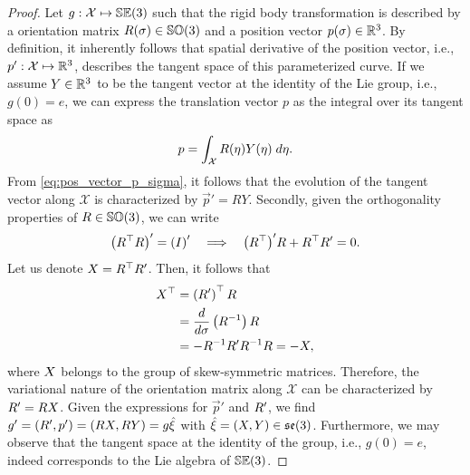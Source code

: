 \begin{proof}
Let ${g}: \mathcal{X} \mapsto {\mathbb{SE}(3)}$ such that the rigid body transformation is described by a orientation matrix $R(\sigma) \in {\mathbb{SO}(3)}$ and a position vector $p(\sigma) \in \mathbb{R}^3$. By definition, it inherently follows that spatial derivative of the position vector, i.e., ${p}': \mathcal{X} \mapsto \mathbb{R}^3$, describes the tangent space of this parameterized curve. If we assume ${Y} \in \mathbb{R}^3$ to be the tangent vector at the identity of the Lie group, i.e., $g(0) = e$, we can express the translation vector $p$ as the integral over its tangent space as
\begin{equation}
{p} = \int_\mathcal{X} {R}(\eta) {Y}(\eta) \; d\eta. \label{eq:pos_vector_p_sigma}
\end{equation}
From \eqref{eq:pos_vector_p_sigma}, it follows that the evolution of the tangent vector along $\mathcal{X}$ is characterized by $\vec{p}' = R Y$. Secondly, given the orthogonality properties of $R \in {\mathbb{SO}(3)}$, we can write
\begin{align}
\left( R^\top R \right)' = \left( {I} \right)' \quad \Longrightarrow \quad \left({R}^\top \right)'\!{R} + {R}^\top {R}' = {0}.
\end{align}
Let us denote ${{X}} = {R}^\top {R}'$. Then, it follows that 
\begin{align}
 {X}^\top & = \left({R}'\right)^\top {R} \notag \\ 
& = \frac{d}{d\sigma}\left({R}^{-1} \right) {R} \notag \\ 
& = -{R}^{-1} {R}' {R}^{-1} {R} = -{X},
\end{align}
where ${{X}}$ belongs to the group of skew-symmetric matrices. Therefore, the variational nature of the orientation matrix along $\mathcal{X}$ can be characterized by ${R}' = R {X}$. Given the expressions for $\vec{p}'$ and ${R}'$, we find $g' = ({R}',{p}') = ({R}{{X}},{R}{Y}) = g\hat{{\xi}}$ with $\hat{{\xi}} = ({X},{{Y}}) \in {\mathfrak{se}(3)}$. Furthermore, we may observe that the tangent space at the identity of the group, i.e., $g(0) = e$, indeed corresponds to the Lie algebra of ${\mathbb{SE}(3)}$.
\end{proof}


